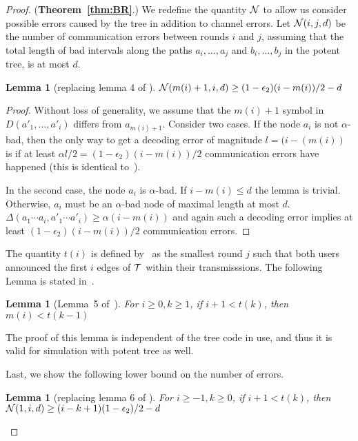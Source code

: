 \documentclass[ letterpaper, 11pt]{article}
\newtheorem{lemma}[theorem]{Lemma}
\begin{document}
\begin{proof} (\textbf{Theorem~\ref{thm:BR}}.)
We redefine the quantity $\cal N$ to allow us consider possible errors caused by the tree in addition to   channel errors. Let ${\cal N}(i,j,d)$  be the number of communication errors between rounds $i$ and $j$, assuming that the total length of bad intervals along the paths $a_i,\ldots,a_j$ and $b_i,\ldots,b_j$ in the potent tree, is at most $d$.


\begin{lemma}[replacing lemma 4 of \cite{BR10}]\label{lem:4}
${\cal N}(m(i)+1,i,d)\ge (1-\epsilon_2)(i-m(i))/2-d$
\end{lemma}
\begin{proof}
Without loss of generality, we assume that the $m(i)+1$ symbol in $D(a'_1,\ldots,a'_i)$ differs from $a_{m(i)+1}$. Consider two cases. If the node $a_i$ is not $\alpha$-bad,
then the only way to get a decoding error of magnitude $l=(i-(m(i))$ is if at least
$\alpha l/2=(1-\epsilon_2)(i-m(i))/2$ communication errors have happened (this is identical to~\cite{BR10}).

In the second case, the node $a_i$ is $\alpha$-bad.
If $i-m(i) \le  d$ the lemma is trivial.
Otherwise, $a_i$ must be an $\alpha$-bad node of maximal length at most $d$.
$\Delta(a_1\cdots a_i,a'_1\cdots a'_i) \ge \alpha (i-m(i))$ and again such a decoding error
implies at least $(1-\epsilon_2)(i-m(i))/2$ communication errors.
\end{proof}

The quantity $t(i)$ is defined by~\cite{BR10} as the smallest round $j$ such that both users announced 
the first $i$ edges of $\cal T$ within their transmisssions. The following Lemma is stated in~\cite{BR10}.
\begin{lemma}[Lemma~5 of~\cite{BR10}]\label{lem:5}
For $i\ge 0, k\ge 1$, if $i+1<t(k)$, then $m(i) < t(k-1)$
\end{lemma}
\noindent The proof of this lemma is independent of the tree code in use, and thus it is valid for simulation with potent tree as well.

Last, we show the following lower bound on the number of errors.
\begin{lemma}[replacing lemma 6 of \cite{BR10}]\label{lem:6}
For $i\ge-1, k\ge 0$, if $i+1<t(k)$, then ${\cal N}(1,i,d)\ge(i-k+1)(1-\epsilon_2)/2-d$
\end{lemma}


\end{proof}
\end{document}
